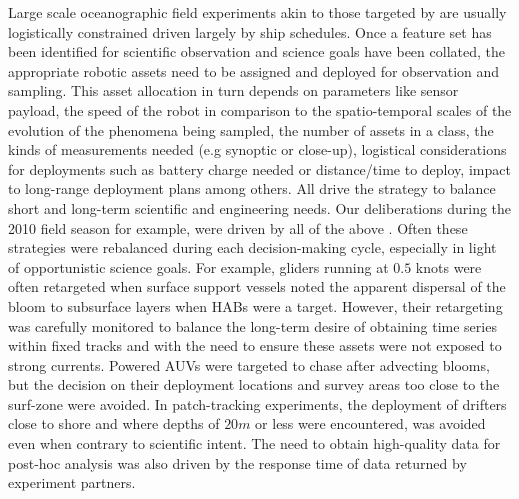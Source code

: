 Large scale oceanographic field experiments akin to those targeted by
\can are usually logistically constrained driven largely by ship
schedules.  Once a feature set has been identified for scientific
observation and science goals have been collated, the appropriate
robotic assets need to be assigned and deployed for observation and
sampling. This asset allocation in turn depends on parameters like
sensor payload, the speed of the robot \situ in comparison to the
spatio-temporal scales of the evolution of the phenomena being
sampled, the number of assets in a class, the kinds of measurements
needed (e.g synoptic or close-up), logistical considerations for
deployments such as battery charge needed or distance/time to deploy,
impact to long-range deployment plans among others. All drive the
strategy to balance short and long-term scientific and engineering
needs. Our \can deliberations during the 2010 field season for example,
were driven by all of the above \cite{das11}. Often these strategies
were rebalanced during each decision-making cycle, especially in light
of opportunistic science goals. For example, gliders running at $0.5$
knots were often retargeted when surface support vessels noted the
apparent dispersal of the bloom to subsurface layers when HABs were a
\can target. However, their retargeting was carefully
monitored to balance the long-term desire of obtaining time series
within fixed tracks and with the need to ensure these assets were not
exposed to strong currents. Powered AUVs were targeted to chase after
advecting blooms, but the decision on their deployment locations and
survey areas too close to the surf-zone were avoided. In
patch-tracking experiments, the deployment of drifters close to shore
and where depths of $20m$ or less were encountered, was avoided even
when contrary to scientific intent. The need to obtain high-quality
data for post-hoc analysis was also driven by the response time of
data returned by experiment partners.

